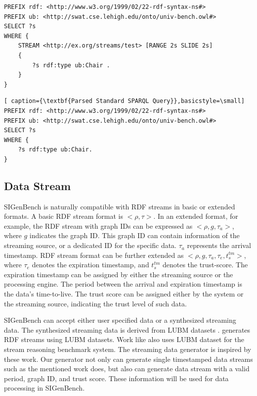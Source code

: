 \begin{lstlisting}[caption={\textbf{CQELS Query Example}},basicstyle=\small]
PREFIX rdf: <http://www.w3.org/1999/02/22-rdf-syntax-ns#>
PREFIX ub: <http://swat.cse.lehigh.edu/onto/univ-bench.owl#>
SELECT ?s 
WHERE { 
	STREAM <http://ex.org/streams/test> [RANGE 2s SLIDE 2s] 
	{ 
    	?s rdf:type ub:Chair . 
    } 
}
\end{lstlisting}

\begin{lstlisting}[ caption={\textbf{Parsed Standard SPARQL Query}},basicstyle=\small]
PREFIX rdf: <http://www.w3.org/1999/02/22-rdf-syntax-ns#>
PREFIX ub: <http://swat.cse.lehigh.edu/onto/univ-bench.owl#>
SELECT ?s
WHERE {	
	?s rdf:type ub:Chair.
}
\end{lstlisting}
%
\subsection{Data Stream}
SIGenBench is naturally compatible with RDF streams in basic or extended formats.
A basic RDF stream format is $<\rho, \tau>$.
In an extended format, for example, the RDF stream with graph IDs can be expressed as $<\rho, g, \tau_{a}>$, where $g$ indicates the graph ID. 
This graph ID can contain information of the streaming source, or a dedicated ID for the specific data. 
$\tau_{a}$ represents the arrival timestamp. 
RDF stream format can be further extended as $<\rho, g, \tau_{a}, \tau_{e}, t^{tm}_{s}>$, where $\tau_{e}$ denotes the expiration timestamp, and $t^{tm}_{s}$ denotes the trust-score.
The expiration timestamp can be assigned by either the streaming source or the processing engine.
The period between the arrival and expiration timestamp is the data's time-to-live. 
The trust score can be assigned either by the system or the streaming source, indicating the trust level of such data. 

SIGenBench can accept either user specified data or a synthesized streaming data.
The synthesized streaming data is derived from LUBM datasets \cite{guo2005lubm}. 
\cite{DBLP:conf/semweb/NguyenS13} generates RDF streams using LUBM datasets.
Work like \cite{tommasini2015heaven} also uses LUBM dataset for the stream reasoning benchmark system.
The streaming data generator is inspired by these work. 
Our generator not only can generate single timestamped data streams such as the mentioned work does, but also can generate data stream with a valid period, graph ID, and trust score.
These information will be used for data processing in SIGenBench.

